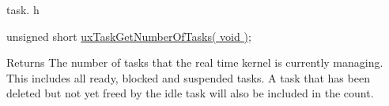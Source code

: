task. h 
\begin{DoxyPre}unsigned short \hyperlink{win32_2win32_2_libraries_2_free_r_t_o_s_2_source_2tasks_8c_a192988eef7c43ec387493f4a29df4ce7}{uxTaskGetNumberOfTasks( void )};\end{DoxyPre}


\begin{DoxyReturn}{Returns}
The number of tasks that the real time kernel is currently managing. This includes all ready, blocked and suspended tasks. A task that has been deleted but not yet freed by the idle task will also be included in the count. 
\end{DoxyReturn}
